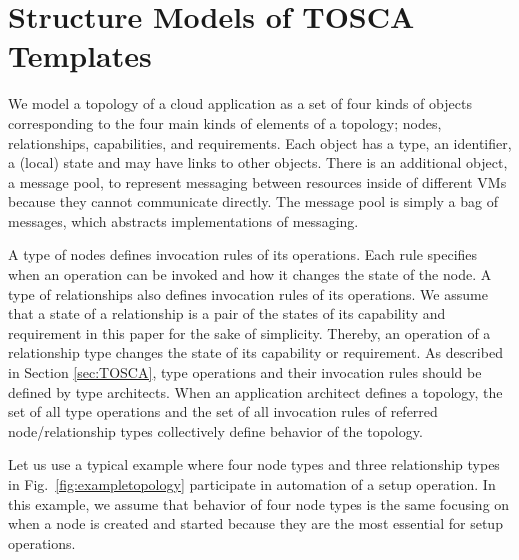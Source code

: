 \documentclass[12pt]{report}
\begin{document}
\section{Structure Models of TOSCA Templates}
\label{sec:TOSCAstructure}
We model a topology of a cloud application as a set of four kinds of
objects corresponding to the four main kinds of elements of a
topology; nodes, relationships, capabilities, and requirements. Each
object has a type, an identifier, a (local) state and may have links
to other objects. 
There is an additional object, a message pool, to represent messaging
between resources inside of different VMs because they
cannot communicate directly. The message pool is simply a bag of
messages, which abstracts implementations of messaging.

A type of nodes defines invocation rules of its operations. Each rule
specifies when an operation can be invoked and how it changes the
state of the node.  A type of relationships also defines invocation
rules of its operations. We assume that a state of a relationship is a
pair of the states of its capability and requirement in this paper for
the sake of simplicity. Thereby, an operation of a relationship type
changes the state of its capability or requirement.  As described in
Section \ref{sec:TOSCA}, type operations and their invocation rules
should be defined by type architects. When an application architect
defines a topology, the set of all type operations and the set of all
invocation rules of referred node/relationship types collectively
define behavior of the topology.

Let us use a typical example where four node types and three
relationship types in Fig.~\ref{fig:exampletopology} participate in
automation of a setup operation. In this example, we assume that
behavior of four node types is the same focusing on when a node is
created and started because they are the most essential for setup
operations.

\end{document}
